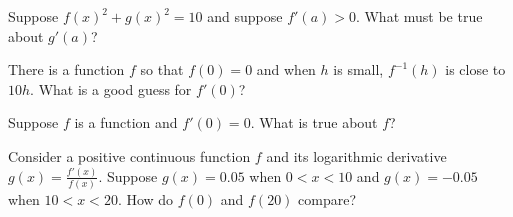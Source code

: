 \documentclass{ximera}
\newcommand{\recommendation}[1]{}
\begin{document}
\begin{problem}
  Suppose $f(x)^2 + g(x)^2 = 10$ and suppose $f'(a) > 0$.  What must be true about $g'(a)$?
  \begin{multipleChoice}
  \end{multipleChoice}
\end{problem}



\begin{problem}
  There is a function $f$ so that $f(0) = 0$ and when $h$ is small, $f^{-1}(h)$ is close to $10 h$.  What is a good guess for $f'(0)$?
  \begin{multipleChoice}
  \end{multipleChoice}
\end{problem}

\begin{problem}
  Suppose $f$ is a function and $f'(0) = 0$.  What is true about $f$?
  \begin{multipleChoice}
  \end{multipleChoice}
\end{problem}



\begin{problem}
  Consider a positive continuous function $f$ and its logarithmic derivative $g(x) = \frac{f'(x)}{f(x)}$.  Suppose $g(x) = 0.05$ when $0 < x < 10$ and $g(x) = -0.05$ when $10 < x < 20$.  How do $f(0)$ and $f(20)$ compare?
  \begin{multipleChoice}
  \end{multipleChoice}
\end{problem}
\end{document}
